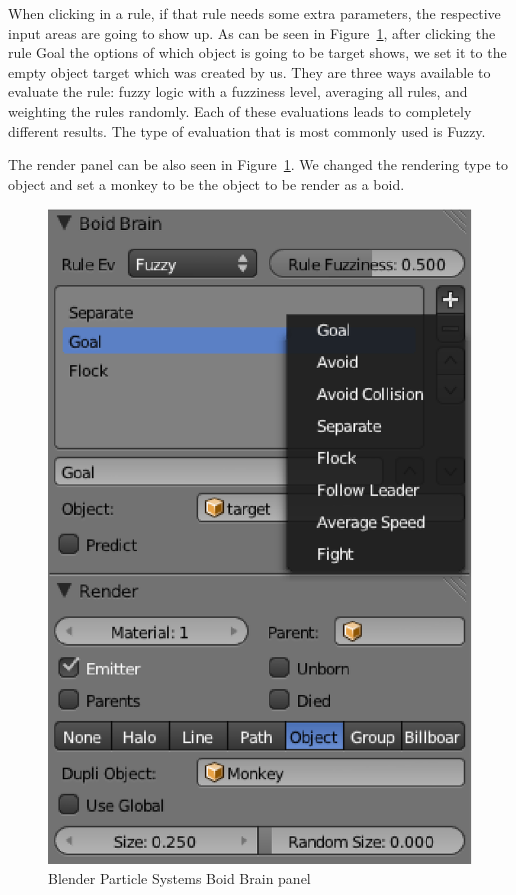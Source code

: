 When clicking in a rule, if that rule needs some extra parameters, the respective input areas are going to show up. As can be seen in Figure~\ref{boidsBrain}, after clicking the rule Goal the options of which object is going to be target shows, we set it to the empty object target which was created by us. They are three ways available to evaluate the rule: fuzzy logic with a fuzziness level, averaging all rules, and weighting the rules randomly. Each of these evaluations leads to completely different results. The type of evaluation that is most commonly used is Fuzzy.

The render panel can be also seen in Figure~\ref{boidsBrain}. We changed the rendering type to object and set a monkey to be the object to be render as a boid.

\begin{figure}[htbp]
\begin{center}
\includegraphics[scale = 0.5]{figures/boidsBrain.eps}
\caption{Blender Particle Systems Boid Brain panel}
\label{boidsBrain}
\end{center}
\end{figure}

